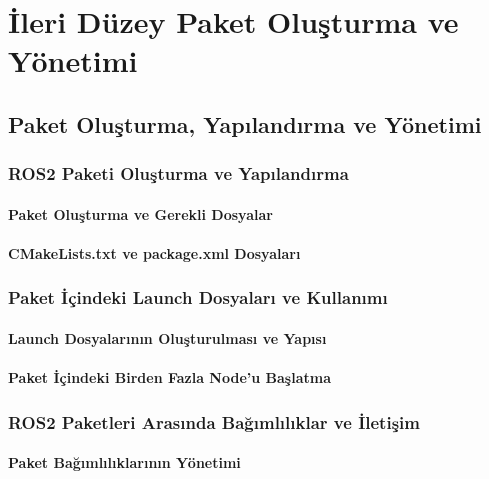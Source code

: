 \chapter{İleri Düzey Paket Oluşturma ve Yönetimi}

\section{Paket Oluşturma, Yapılandırma ve Yönetimi}
\subsection{ROS2 Paketi Oluşturma ve Yapılandırma}
\subsubsection{Paket Oluşturma ve Gerekli Dosyalar}

\subsubsection{CMakeLists.txt ve package.xml Dosyaları}

\subsection{Paket İçindeki Launch Dosyaları ve Kullanımı}
\subsubsection{Launch Dosyalarının Oluşturulması ve Yapısı}

\subsubsection{Paket İçindeki Birden Fazla Node'u Başlatma}

\subsection{ROS2 Paketleri Arasında Bağımlılıklar ve İletişim}
\subsubsection{Paket Bağımlılıklarının Yönetimi}


